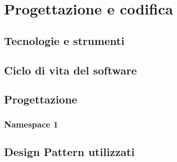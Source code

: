 \chapter{Progettazione e codifica}
\label{chap:progettazione-codifica}

\section{Tecnologie e strumenti}
\label{sec:tecnologie-strumenti}




\section{Ciclo di vita del software}
\label{sec:ciclo-vita-software}

\section{Progettazione}
\label{sec:progettazione}

\subsection{Namespace 1}

\section{Design Pattern utilizzati}


\newpage